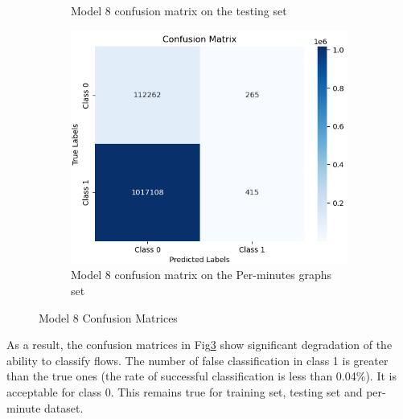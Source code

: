 \begin{figure}[H]
\begin{subfigure}{0.49\textwidth}
        \caption{Model 8 confusion matrix on the testing set}
    \label{fig:do_4_cm2}
    \end{subfigure}
    \begin{subfigure}{0.49\textwidth}
        \centering
        \includegraphics[width=\linewidth]{figures/ev/do_4_cm3.png}
        \caption{Model 8 confusion matrix on the Per-minutes graphs set}
    \label{fig:do_4_cm3}
    \end{subfigure}
    \captionsetup{font=large}
    \caption{Model 8 Confusion Matrices}
    \label{fig:8_cm}
\end{figure}
As a result, the confusion matrices in Fig\ref{fig:8_cm} show significant degradation of the ability to classify flows. The number of false classification in class 1 is greater than the true ones (the rate of successful classification is less than 0.04\%). It is acceptable for class 0. This remains true for training set, testing set and per-minute dataset.
